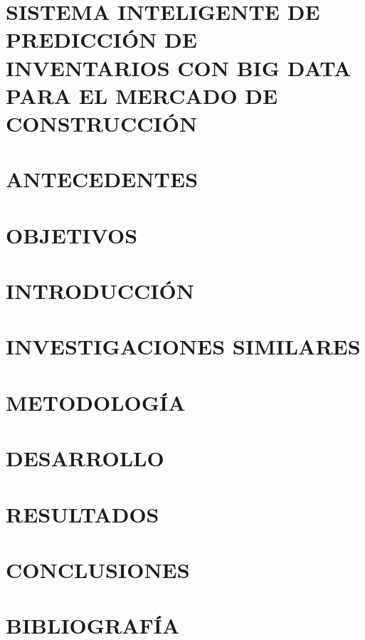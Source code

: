 \documentclass{article}
\begin{document}
    \section*{\centering SISTEMA INTELIGENTE DE PREDICCIÓN DE INVENTARIOS CON BIG DATA PARA EL MERCADO DE CONSTRUCCIÓN}
    \section{ANTECEDENTES}
    \section{OBJETIVOS}
    \section{INTRODUCCIÓN}
    \section{INVESTIGACIONES SIMILARES}
    \section{METODOLOGÍA}
    \section{DESARROLLO}
    \section{RESULTADOS}
    \section{CONCLUSIONES}
    \section{BIBLIOGRAFÍA}
\end{document}
